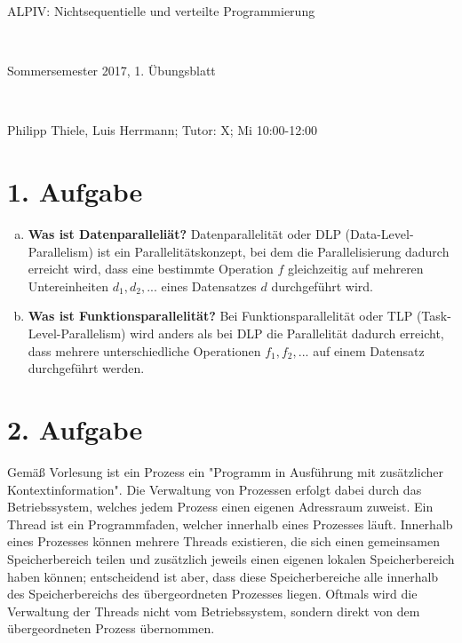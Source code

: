 \documentclass[numbers=noendperiod]{scrartcl}
\begin{document}
	
	
\hrulefill
\begin{center}
	\bfseries %
	\sffamily %
	\begin{huge}
		ALPIV: Nichtsequentielle und verteilte Programmierung
	\end{huge}\\
	\begin{Large}
		Sommersemester 2017, 1. Übungsblatt
	\end{Large}\\
	\begin{small}
		Philipp Thiele, Luis Herrmann; Tutor: X; Mi 10:00-12:00
	\end{small}
	
	\vspace{-10pt}
\end{center}
\hrulefill

\section*{1. Aufgabe}
\begin{enumerate}[a)]
	\item \textbf{Was ist Datenparalleliät?} Datenparallelität oder DLP (Data-Level-Parallelism) ist ein Parallelitätskonzept, bei dem die Parallelisierung dadurch erreicht wird, dass eine bestimmte Operation $f$ gleichzeitig auf mehreren Untereinheiten $d_1,d_2,...$ eines Datensatzes $d$ durchgeführt wird.
	\item \textbf{Was ist Funktionsparallelität?} Bei Funktionsparallelität oder TLP (Task-Level-Parallelism) wird anders als bei DLP die Parallelität dadurch erreicht, dass mehrere unterschiedliche Operationen $f_1,f_2,...$ auf einem Datensatz durchgeführt werden.
\end{enumerate}

\section*{2. Aufgabe}
Gemäß Vorlesung ist ein Prozess ein "Programm in Ausführung mit zusätzlicher Kontextinformation". Die Verwaltung von Prozessen erfolgt dabei durch das Betriebssystem, welches jedem Prozess einen eigenen Adressraum zuweist. Ein Thread ist ein Programmfaden, welcher innerhalb eines Prozesses läuft. Innerhalb eines Prozesses können mehrere Threads existieren, die sich einen gemeinsamen Speicherbereich teilen und zusätzlich jeweils einen eigenen lokalen Speicherbereich haben können; entscheidend ist aber, dass diese Speicherbereiche alle innerhalb des Speicherbereichs des übergeordneten Prozesses liegen. Oftmals wird die Verwaltung der Threads nicht vom Betriebssystem, sondern direkt von dem übergeordneten Prozess übernommen. 
\end{document}
